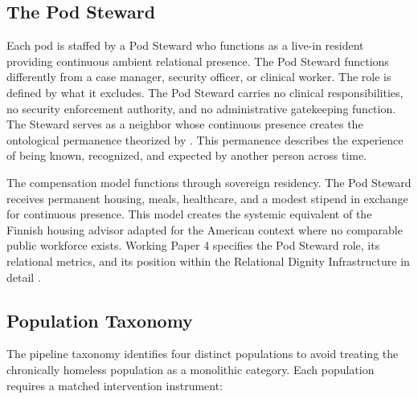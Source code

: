 \documentclass[12pt, letterpaper]{article}
\begin{document}
\subsection{The Pod Steward}

Each pod is staffed by a Pod Steward who functions as a live-in resident providing continuous ambient relational presence. The Pod Steward functions differently from a case manager, security officer, or clinical worker. The role is defined by what it excludes. The Pod Steward carries no clinical responsibilities, no security enforcement authority, and no administrative gatekeeping function. The Steward serves as a neighbor whose continuous presence creates the ontological permanence theorized by \citet{giddens_1991}. This permanence describes the experience of being known, recognized, and expected by another person across time.

The compensation model functions through sovereign residency. The Pod Steward receives permanent housing, meals, healthcare, and a modest stipend in exchange for continuous presence. This model creates the systemic equivalent of the Finnish housing advisor adapted for the American context where no comparable public workforce exists. Working Paper 4 specifies the Pod Steward role, its relational metrics, and its position within the Relational Dignity Infrastructure in detail \citep{dibella_2026_wp4}.

\subsection{Population Taxonomy}

The pipeline taxonomy identifies four distinct populations to avoid treating the chronically homeless population as a monolithic category. Each population requires a matched intervention instrument:
\end{document}
